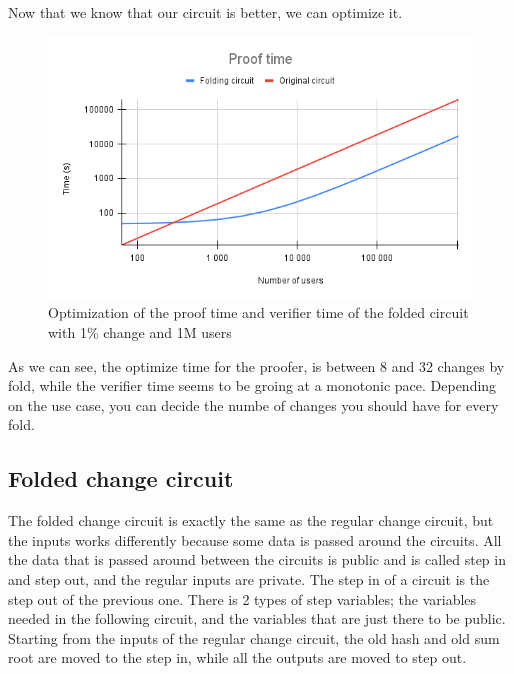 Now that we know that our circuit is better, we can optimize it.

\begin{figure}[H]
   \centering
   \includegraphics[width=130mm]{Proof time.png}
   \caption{Optimization of the proof time and verifier time of the folded circuit with 1\% change and 1M users}
   \label{overflow}
   \end{figure}

As we can see, the optimize time for the proofer, is between 8 and 32 changes by fold, while the verifier time seems to be groing at a monotonic pace.
Depending on the use case, you can decide the numbe of changes you should have for every fold. 

\subsection{Folded change circuit}
The folded change circuit is exactly the same as the regular change circuit, but the inputs works differently because some data is passed around the circuits.
All the data that is passed around between the circuits is public and is called step in and step out, and the regular inputs are private.
The step in of a circuit is the step out of the previous one. There is 2 types of step variables; the variables needed in the following circuit,
and the variables that are just there to be public. 
Starting from the inputs of the regular change circuit, the old hash and old sum root are moved to the step in, while all the outputs are moved to step out.

